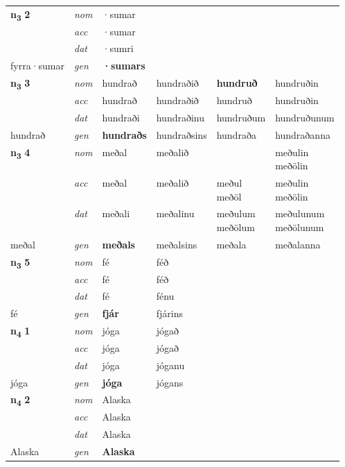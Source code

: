 \begin{longtable}[l]{X>{\footnotesize\itshape}XXXXX}
\multirow{3}{*}{{{\textbf{n{\textsubscript{3}}} \Large{\textbf{2}}}}} & nom & ·sumar &  & \textbf{} &  \\*
 & acc & ·sumar &  &  &  \\*
 & dat & ·sumri &  &  &  \\*
 {\footnotesize{fyrra\allowbreak ·sumar}} & gen & \textbf{·sumars} &  &  &  \\
\midrule

\multirow{3}{*}{{{\textbf{n{\textsubscript{3}}} \Large{\textbf{3}}}}} & nom & hundrað & hundraðið & \textbf{hundruð} & hundruðin \\*
 & acc & hundrað & hundraðið & hundruð & hundruðin \\*
 & dat & hundraði & hundraðinu & hundruðum & hundruðunum \\*
 {\footnotesize{hundrað}} & gen & \textbf{hundraðs} & hundraðsins & hundraða & hundraðanna \\
\midrule

\multirow{3}{*}{{{\textbf{n{\textsubscript{3}}} \Large{\textbf{4}}}}} & nom & meðal & meðalið & \textbf{\specialcell{meðul\\ meðöl}} & \specialcell{meðulin\\ meðölin} \\*
 & acc & meðal & meðalið & \specialcell{meðul\\ meðöl} & \specialcell{meðulin\\ meðölin} \\*
 & dat & meðali & meðalinu & \specialcell{meðulum\\ meðölum} & \specialcell{meðulunum\\ meðölunum} \\*
 {\footnotesize{meðal}} & gen & \textbf{meðals} & meðalsins & meðala & meðalanna \\
\midrule

\multirow{3}{*}{{{\textbf{n{\textsubscript{3}}} \Large{\textbf{5}}}}} & nom & fé & féð & \textbf{} &  \\*
 & acc & fé & féð &  &  \\*
 & dat & fé & fénu &  &  \\*
 {\footnotesize{fé}} & gen & \textbf{fjár} & fjárins &  &  \\
\midrule

\multirow{3}{*}{{{\textbf{n{\textsubscript{4}}} \Large{\textbf{1}}}}} & nom & jóga & jógað & \textbf{} &  \\*
 & acc & jóga & jógað &  &  \\*
 & dat & jóga & jóganu &  &  \\*
 {\footnotesize{jóga}} & gen & \textbf{jóga} & jógans &  &  \\
\midrule

\multirow{3}{*}{{{\textbf{n{\textsubscript{4}}} \Large{\textbf{2}}}}} & nom & Alaska &  & \textbf{} &  \\*
 & acc & Alaska &  &  &  \\*
 & dat & Alaska &  &  &  \\*
 {\footnotesize{Alaska}} & gen & \textbf{Alaska} &  &  &  \\
\bottomrule
\end{longtable}
